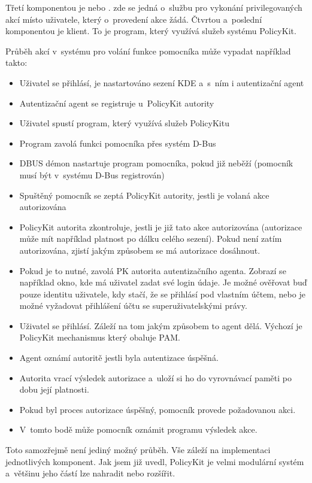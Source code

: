 Třetí komponentou je  nebo . zde se jedná o~službu pro vykonání privilegovaných akcí místo uživatele, který o~provedení akce žádá. Čtvrtou a~poslední komponentou je klient. To je program, který využívá služeb systému PolicyKit.

Průběh akcí v~systému pro volání funkce pomocníka může vypadat například takto:
\begin{itemize}
\item Uživatel se přihlásí, je nastartováno sezení KDE a~s~ním i autentizační agent
\item Autentizační agent se registruje u~PolicyKit autority
\item Uživatel spustí program, který využívá služeb PolicyKitu
\item Program zavolá funkci pomocníka přes systém D-Bus
\item DBUS démon nastartuje program pomocníka, pokud již neběží (pomocník musí být v~systému D-Bus registrován)
\item Spuštěný pomocník se zeptá PolicyKit autority, jestli je volaná akce autorizována
\item PolicyKit autorita zkontroluje, jestli je již tato akce autorizována (autorizace může mít například platnost po dálku celého sezení). Pokud není zatím autorizována, zjistí jakým způsobem se má autorizace dosáhnout.
\item Pokud je to nutné, zavolá PK autorita autentizačního agenta. Zobrazí se například okno, kde má uživatel zadat své login údaje. Je možné ověřovat buď pouze identitu uživatele, kdy stačí, že se přihlásí pod vlastním účtem, nebo je možné vyžadovat přihlášení účtu se superuživatelskými právy.
\item Uživatel se přihlásí. Záleží na tom jakým způsobem to agent dělá. Výchozí je PolicyKit mechanismus který obaluje PAM.
\item Agent oznámí autoritě jestli byla autentizace úspěšná.
\item Autorita vrací výsledek autorizace a~uloží si ho do vyrovnávací paměti po dobu její platnosti.
\item Pokud byl proces autorizace úspěšný, pomocník provede požadovanou akci.
\item V~tomto bodě může pomocník oznámit programu výsledek akce.
\end{itemize}

Toto samozřejmě není jediný možný průběh. Vše záleží na implementaci jednotlivých komponent. Jak jsem již uvedl, PolicyKit je velmi modulární systém a~většinu jeho částí lze nahradit nebo rozšířit.

